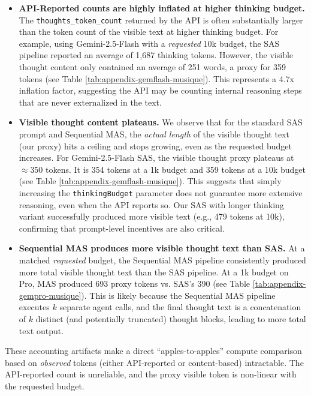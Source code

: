 \documentclass{article} %
\begin{document}
\begin{itemize}
    \item \textbf{API-Reported counts are highly inflated at higher thinking budget.} The \texttt{thoughts\_token\_count} returned by the API is often substantially larger than the token count of the visible text at higher thinking budget. For example, using Gemini-2.5-Flash with a \emph{requested} 10k budget, the SAS pipeline reported an average of 1,687 thinking tokens. However, the visible thought content only contained an average of 251 words, a proxy for 359 tokens (see Table \ref{tab:appendix-gemflash-musique}). This represents a 4.7x inflation factor, suggesting the API may be counting internal reasoning steps that are never externalized in the text.

    \item \textbf{Visible thought content plateaus.} We observe that for the standard SAS prompt and Sequential MAS, the \emph{actual length} of the visible thought text (our proxy) hits a ceiling and stops growing, even as the requested budget increases. For Gemini-2.5-Flash SAS, the visible thought proxy plateaus at $\approx$350 tokens. It is 354 tokens at a 1k budget and 359 tokens at a 10k budget (see Table \ref{tab:appendix-gemflash-musique}). This suggests that simply increasing the \texttt{thinkingBudget} parameter does not guarantee more extensive reasoning, even when the API reports so. Our SAS with longer thinking variant successfully produced more visible text (e.g., 479 tokens at 10k), confirming that prompt-level incentives are also critical.
    
    \item \textbf{Sequential MAS produces more visible thought text than SAS.} At a matched \emph{requested} budget, the Sequential MAS pipeline consistently produced more total visible thought text than the SAS pipeline. At a 1k budget on Pro, MAS produced 693 proxy tokens vs. SAS's 390 (see Table \ref{tab:appendix-gempro-musique}). This is likely because the Sequential MAS pipeline executes $k$ separate agent calls, and the final thought text is a concatenation of $k$ distinct (and potentially truncated) thought blocks, leading to more total text output.
\end{itemize}

These accounting artifacts make a direct ``apples-to-apples'' compute comparison based on \emph{observed} tokens (either API-reported or content-based) intractable. The API-reported count is unreliable, and the proxy visible token is non-linear with the requested budget.
\end{document}

